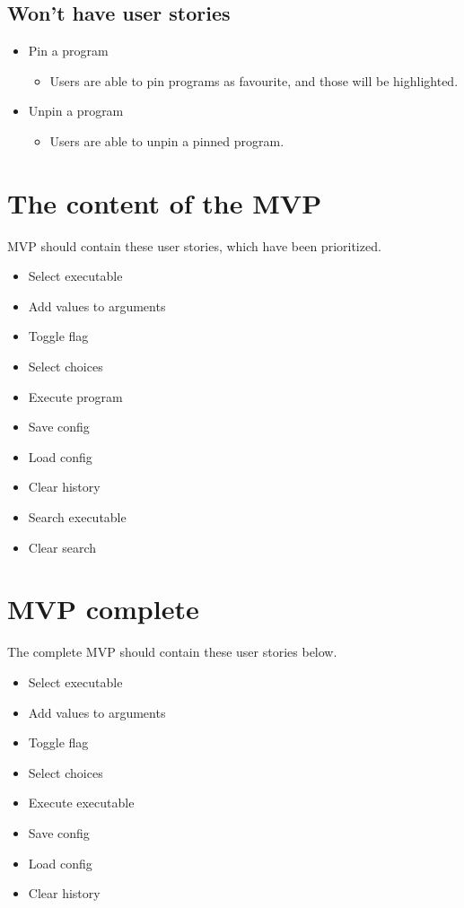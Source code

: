 \documentclass{article}
\begin{document}
\subsection{Won't have user stories }
\begin{itemize}
    \item Pin a program
    \begin{itemize}
        \item Users are able to pin programs as favourite, and those will be highlighted.
    \end{itemize}
    \item Unpin a program
    \begin{itemize}
        \item Users are able to unpin a pinned program.
    \end{itemize}
\end{itemize}

\section{The content of the MVP}
MVP should contain these user stories, which have been prioritized.
\begin{itemize}
    \item Select executable
    \item Add values to arguments
    \item Toggle flag
    \item Select choices
    \item Execute program
    \item Save config
    \item Load config
    \item Clear history
    \item Search executable
    \item Clear search
\end{itemize}

\section{MVP complete}
The complete MVP should contain these user stories below.
\begin{itemize}
    \item Select executable
    \item Add values to arguments
    \item Toggle flag
    \item Select choices
    \item Execute executable
    \item Save config
    \item Load config
    \item Clear history
\end{itemize}
\end{document}
